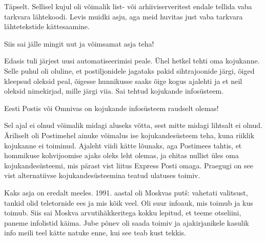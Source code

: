 
Täpselt. Sellisel kujul oli võimalik list- või 
arhiiviserveritest endale tellida vaba tarkvara lähtekoodi. Levis muidki asju, 
aga meid huvitas just vaba tarkvara lähtetekstide kättesaamine.


Siis sai jälle mingit uut ja võimsamat asja teha!

Edasis tuli järjest uusi automatiseerimisi peale. Ühel hetkel 
tehti oma kojukanne. Selle puhul oli oluline, et postiljonidele 
jagataks pakid sihtrajoonide järgi, õiged kleepsud oleksid peal, õigesse 
hunnikusse saaks õige kogus ajalehti ja et neil oleksid nimekirjad, mille järgi 
viia. Sai tehtud kojukande infosüsteem. 


Eesti Postis või Omnivas on kojukande infosüsteem raudselt olemas!


Sel ajal ei olnud võimalik midagi aluseks võtta, sest mitte midagi lihtsalt ei 
olnud. Äriliselt oli Postimehel ainuke võimalus ise kojukandesüsteem teha, 
kuna riiklik kojukanne ei toiminud. Ajaleht viidi kätte lõunaks, aga Postimees 
tahtis, et hommikuse kohvijoomise ajaks oleks leht olemas, ja ehitas nullist 
üles oma kojukandesüsteemi, mis pärast vist liitus Express Posti omaga. 
Praegugi on see vist alternatiivse kojukandesüsteemina teatud ulatuses 
toimiv.


Kaks asja on eredalt meeles. 1991. aastal oli 
Moskvas putš: vahetati valitsust, tankid olid
teletornide ees ja mis kõik veel. Oli suur infoauk, mis toimub ja kus toimub. 
Siis sai Moskva arvutihäkkeritega kokku lepitud, et teeme 
otseliini, paneme infolistid käima. Jube põnev oli saada toimiv ja 
ajakirjanikele kasulik info meili teel kätte natuke enne, kui see teab 
kust tekkis. 

